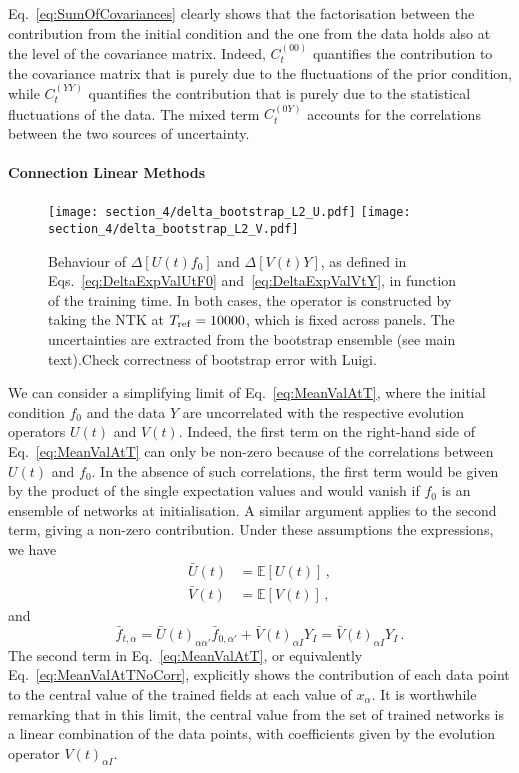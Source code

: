 Eq.~\eqref{eq:SumOfCovariances} clearly shows that the factorisation between the
contribution from the initial condition and the one from the data holds also at
the level of the covariance matrix. Indeed, $C_t^{(00)}$ quantifies the
contribution to the covariance matrix that is purely due to the fluctuations of
the prior condition, while $C_t^{(YY)}$ quantifies the contribution that is
purely due to the statistical fluctuations of the data. The mixed term
$C_t^{(0Y)}$ accounts for the correlations between the two sources of
uncertainty.


\paragraph{Connection Linear Methods}
\begin{figure}[t!]
  \centering
  \texttt{[image: section\_4/delta\_bootstrap\_L2\_U.pdf]}
  \texttt{[image: section\_4/delta\_bootstrap\_L2\_V.pdf]}
  \caption{Behaviour of $\Delta [U(t)f_0]$ and $\Delta [V(t)Y]$, as defined in
  Eqs.~\eqref{eq:DeltaExpValUtF0} and~\eqref{eq:DeltaExpValVtY}, in function of the training
  time. In both cases, the operator is constructed by taking the NTK at $T_{\rm
  ref} = 10000$, which is fixed across panels. The uncertainties are extracted
  from the bootstrap ensemble (see main text).\ac{Check correctness of bootstrap
  error with Luigi.}}
    \label{fig:xT3_exp_val}
\end{figure}

We can consider a simplifying limit of Eq.~\eqref{eq:MeanValAtT}, where the
initial condition $f_0$ and the data $Y$ are uncorrelated with the respective
evolution operators $U(t)$ and $V(t)$. Indeed, the first term on the right-hand
side of Eq.~\eqref{eq:MeanValAtT} can only be non-zero because of the
correlations between $U(t)$ and $f_0$. In the absence of such correlations, the
first term would be given by the product of the single expectation values and
would vanish if $f_0$ is an ensemble of networks at initialisation. A similar
argument applies to the second term, giving a non-zero contribution. Under these
assumptions the expressions, we have
\begin{align}
    \label{eq:MeanUt}
    \bar{U}(t)
        &= \mathbb{E}\left[U(t)\right]\, , \\
    \label{eq:MeanVt}
    \bar{V}(t)
        &= \mathbb{E}\left[V(t)\right]\, ,
\end{align}
and
\begin{equation}
    \label{eq:MeanValAtTNoCorr}
    \bar{f}_{t,\alpha} = \bar{U}(t)_{\alpha\alpha'} \bar{f}_{0,\alpha'}
        + \bar{V}(t)_{\alpha I} Y_I = \bar{V}(t)_{\alpha I} Y_I \, .
\end{equation}
The second term in Eq.~\eqref{eq:MeanValAtT}, or equivalently
Eq.~\eqref{eq:MeanValAtTNoCorr}, explicitly shows the contribution of each data
point to the central value of the trained fields at each value of $x_{\alpha}$.
It is worthwhile remarking that in this limit, the central value from the set of
trained networks is a linear combination of the data points, with coefficients
given by the evolution operator $V(t)_{\alpha I}$.

